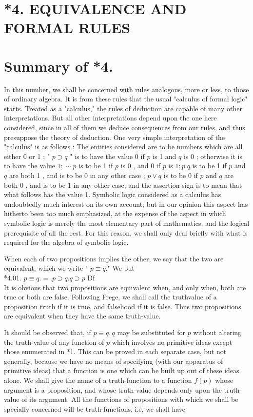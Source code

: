\documentclass[10pt]{article}
\begin{document}
\section*{*4. EQUIVALENCE AND FORMAL RULES}
\section*{Summary of *4.}
In this number, we shall be concerned with rules analogous, more or less, to those of ordinary algebra. It is from these rules that the usual "calculus of formal logic" starts. Treated as a "calculus," the rules of deduction are capable of many other interpretations. But all other interpretations depend upon the one here considered, since in all of them we deduce consequences from our rules, and thus presuppose the theory of deduction. One very simple interpretation of the "calculus" is as follows : The entities considered are to be numbers which are all either 0 or 1 ; " $p \supset q$ " is to have the value 0 if $p$ is 1 and $q$ is 0 ; otherwise it is to have the value $1 ; \sim p$ is to be 1 if $p$ is 0 , and 0 if $p$ is $1 ; p . q$ is to be 1 if $p$ and $q$ are both 1 , and is to be 0 in any other case ; $p \vee q$ is to be 0 if $p$ and $q$ are both 0 , and is to be 1 in any other case; and the assertion-sign is to mean that what follows has the value 1. Symbolic logic considered as a calculus has undoubtedly much interest on its own account; but in our opinion this aspect has hitherto been too much emphasized, at the expense of the aspect in which symbolic logic is merely the most elementary part of mathematics, and the logical prerequisite of all the rest. For this reason, we shall only deal briefly with what is required for the algebra of symbolic logic.

When each of two propositions implies the other, we say that the two are equivalent, which we write " $p \equiv q$." We put\\
*4.01. $p \equiv q .=. p \supset q . q \supset p$ Df\\
It is obvious that two propositions are equivalent when, and only when, both are true or both are false. Following Frege, we shall call the truthvalue of a proposition truth if it is true, and falsehood if it is false. Thus two propositions are equivalent when they have the same truth-value.

It should be observed that, if $p \equiv q, q$ may be substituted for $p$ without altering the truth-value of any function of $p$ which involves no primitive ideas except those enumerated in *1. This can be proved in each separate case, but not generally, because we have no means of specifying (with our apparatus of primitive ideas) that a function is one which can be built up out of these ideas alone. We shall give the name of a truth-function to a function $f(p)$ whose argument is a proposition, and whose truth-value depends only upon the truth-value of its argument. All the functions of propositions with which we shall be specially concerned will be truth-functions, i.e. we shall have
\end{document}
